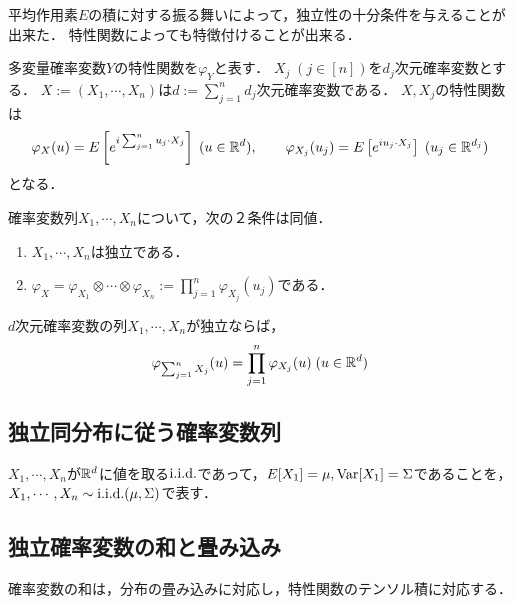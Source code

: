 \documentclass[uplatex,dvipdfmx]{jsreport}
\begin{document}
\begin{tcolorbox}[colframe=ForestGreen, colback=ForestGreen!10!white,breakable,colbacktitle=ForestGreen!40!white,coltitle=black,fonttitle=\bfseries\sffamily,
title=]
    平均作用素$E$の積に対する振る舞いによって，独立性の十分条件を与えることが出来た．
    特性関数によっても特徴付けることが出来る．
\end{tcolorbox}

\begin{notation}
    多変量確率変数$Y$の特性関数を$\varphi_Y$と表す．
    $X_j\;(j\in[n])$を$d_j$次元確率変数とする．
    $X:=(X_1,\cdots,X_n)$は$d:=\sum_{j=1}^nd_j$次元確率変数である．
    $X,X_j$の特性関数は
    \[\varphi_X(u)=E\left[e^{i\sum^n_{j=1}u_j\cdot X_j}\right]\;(u\in\mathbb{R}^d),\qquad\varphi_{X_j}(u_j)=E\left[e^{iu_j\cdot X_j}\right]\;(u_j\in\mathbb{R}^{d_j})\]
    となる．
\end{notation}

\begin{theorem}[Kac]\label{thm-Kac}
    確率変数列$X_1,\cdots,X_n$について，次の２条件は同値．
    \begin{enumerate}
        \item $X_1,\cdots,X_n$は独立である．
        \item $\varphi_X=\varphi_{X_1}\otimes\cdots\otimes\varphi_{X_n}:=\prod_{j=1}^n\varphi_{X_j}(u_j)$である．
    \end{enumerate}
\end{theorem}

\begin{corollary}
    $d$次元確率変数の列$X_1,\cdots,X_n$が独立ならば，
    \[\varphi_{\sum_{j=1}^nX_j}(u)=\prod^n_{j=1}\varphi_{X_j}(u)\;(u\in\mathbb{R}^d)\]
\end{corollary}

\subsection{独立同分布に従う確率変数列}

\begin{notation}
    $X_1,\cdots,X_n$が$\mathbb{R}^d$に値を取る$\mathrm{i.i.d.}$であって，$E[X_1]=\mu,\mathrm{Var}[X_1]=\Sigma$であることを，$X_1,\cdots,X_n\sim\mathrm{i.i.d.}(\mu,\Sigma)$で表す．
\end{notation}

\subsection{独立確率変数の和と畳み込み}

\begin{tcolorbox}[colframe=ForestGreen, colback=ForestGreen!10!white,breakable,colbacktitle=ForestGreen!40!white,coltitle=black,fonttitle=\bfseries\sffamily,
title=]
    確率変数の和は，分布の畳み込みに対応し，特性関数のテンソル積に対応する．
\end{tcolorbox}
\end{document}
